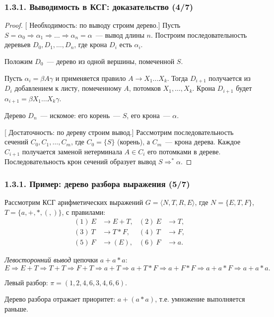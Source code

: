 \documentclass[mathserif,12pt,aspectratio=169]{beamer}
\renewcommand{\index}[1]{}
\def\odmkey#1#2{{\it\color{red} #1}\index{#2}}
\def\proofsection#1{\par{\color{brown}\sffamily\small  [\;}{\sffamily\small\color{brown} #1}{\sffamily\small\color{brown}\;]}\;}
\begin{document}
\begin{frame}
\frametitle{1.3.1. Выводимость в КСГ: доказательство (4/7)}

\begin{proof}
\proofsection{Необходимость: по выводу строим дерево.}
Пусть $S = \alpha_0 \Rightarrow \alpha_1 \Rightarrow \ldots \Rightarrow \alpha_n = \alpha$~--- вывод длины $n$.
Построим последовательность деревьев $D_0, D_1, \ldots, D_n$, где крона $D_i$ есть $\alpha_i$.

Положим $D_0$~--- дерево из одной вершины, помеченной $S$.

Пусть $\alpha_i = \beta A \gamma$ и применяется правило $A \to X_1 \ldots X_k$.
Тогда $D_{i+1}$ получается из $D_i$ добавлением к листу, помеченному $A$, 
потомков $X_1, \ldots, X_k$.
Крона $D_{i+1}$ будет $\alpha_{i+1} = \beta X_1 \ldots X_k \gamma$.

Дерево $D_n$~--- искомое: его корень~--- $S$, его крона~--- $\alpha$.

\proofsection{Достаточность: по дереву строим вывод.}
Рассмотрим последовательность сечений $C_0, C_1, \ldots, C_m$, где $C_0 = \{S\}$ (корень), 
а $C_m$~--- крона дерева.
Каждое $C_{i+1}$ получается заменой нетерминала $A \in C_i$ его потомками в дереве.
Последовательность крон сечений образует вывод $S \Rightarrow^* \alpha$.
\end{proof}

\end{frame}



\begin{frame}
\frametitle{1.3.1. Пример: дерево разбора выражения (5/7)}

\begin{example}
Рассмотрим КСГ арифметических выражений 
$G = \langle N, T, R, E \rangle$, где $N = \{E, T, F\}$, $T = \{a, +, *, (, )\}$, с правилами:
\begin{align*}
(1)\ E &\to E + T, & (2)\ E &\to T, \\
(3)\ T &\to T * F, & (4)\ T &\to F, \\
(5)\ F &\to (E), & (6)\ F &\to a.
\end{align*}

\odmkey{Левосторонний вывод}{Вывод!левосторонний} цепочки $a + a * a$:
\[
E \Rightarrow E + T \Rightarrow T + T \Rightarrow F + T \Rightarrow a + T \Rightarrow a + T * F \Rightarrow a + F * F \Rightarrow a + a * F \Rightarrow a + a * a.
\]

Левый разбор: $\pi = (1, 2, 4, 6, 3, 4, 6, 6)$.

Дерево разбора отражает приоритет: $a + (a * a)$, т.е. умножение выполняется раньше.
\end{example}

\end{frame}
\end{document}
